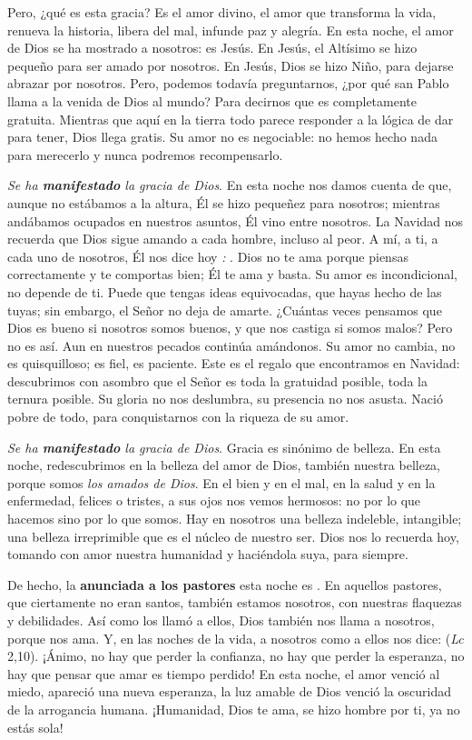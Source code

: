 \begin{body}
\begin{body}
Pero, ¿qué es esta gracia? Es el amor divino, el amor que transforma la vida, renueva la historia, libera del mal, infunde paz y alegría. En esta noche, el amor de Dios se ha mostrado a nosotros: es Jesús. En Jesús, el Altísimo se hizo pequeño para ser amado por nosotros. En Jesús, Dios se hizo Niño, para dejarse abrazar por nosotros. Pero, podemos todavía preguntarnos, ¿por qué san Pablo llama  a la venida de Dios al mundo? Para decirnos que es completamente gratuita. Mientras que aquí en la tierra todo parece responder a la lógica de dar para tener, Dios llega gratis. Su amor no es negociable: no hemos hecho nada para merecerlo y nunca podremos recompensarlo.

\emph{Se ha \textbf{manifestado} la gracia de Dios}. En esta noche nos damos cuenta de que, aunque no estábamos a la altura, Él se hizo pequeñez para nosotros; mientras andábamos ocupados en nuestros asuntos, Él vino entre nosotros. La Navidad nos recuerda que Dios sigue amando a cada hombre, incluso al peor. A mí, a ti, a cada uno de nosotros, Él nos dice hoy \emph{:} . Dios no te ama porque piensas correctamente y te comportas bien; Él te ama y basta. Su amor es incondicional, no depende de ti. Puede que tengas ideas equivocadas, que hayas hecho de las tuyas; sin embargo, el Señor no deja de amarte. ¿Cuántas veces pensamos que Dios es bueno si nosotros somos buenos, y que nos castiga si somos malos? Pero no es así. Aun en nuestros pecados continúa amándonos. Su amor no cambia, no es quisquilloso; es fiel, es paciente. Este es el regalo que encontramos en Navidad: descubrimos con asombro que el Señor es toda la gratuidad posible, toda la ternura posible. Su gloria no nos deslumbra, su presencia no nos asusta. Nació pobre de todo, para conquistarnos con la riqueza de su amor.

\emph{Se ha \textbf{manifestado} la gracia de Dios}. Gracia es sinónimo de belleza. En esta noche, redescubrimos en la belleza del amor de Dios, también nuestra belleza, porque somos \emph{los amados de Dios}. En el bien y en el mal, en la salud y en la enfermedad, felices o tristes, a sus ojos nos vemos hermosos: no por lo que hacemos sino por lo que somos. Hay en nosotros una belleza indeleble, intangible; una belleza irreprimible que es el núcleo de nuestro ser. Dios nos lo recuerda hoy, tomando con amor nuestra humanidad y haciéndola suya,  para siempre.

De hecho, la \textbf{ anunciada a los pastores} esta noche es . En aquellos pastores, que ciertamente no eran santos, también estamos nosotros, con nuestras flaquezas y debilidades. Así como los llamó a ellos, Dios también nos llama a nosotros, porque nos ama. Y, en las noches de la vida, a nosotros como a ellos nos dice:  (\emph{Lc} 2,10). ¡Ánimo, no hay que perder la confianza, no hay que perder la esperanza, no hay que pensar que amar es tiempo perdido! En esta noche, el amor venció al miedo, apareció una nueva esperanza, la luz amable de Dios venció la oscuridad de la arrogancia humana. ¡Humanidad, Dios te ama, se hizo hombre por ti, ya no estás sola!


\end{body}
\end{body}
